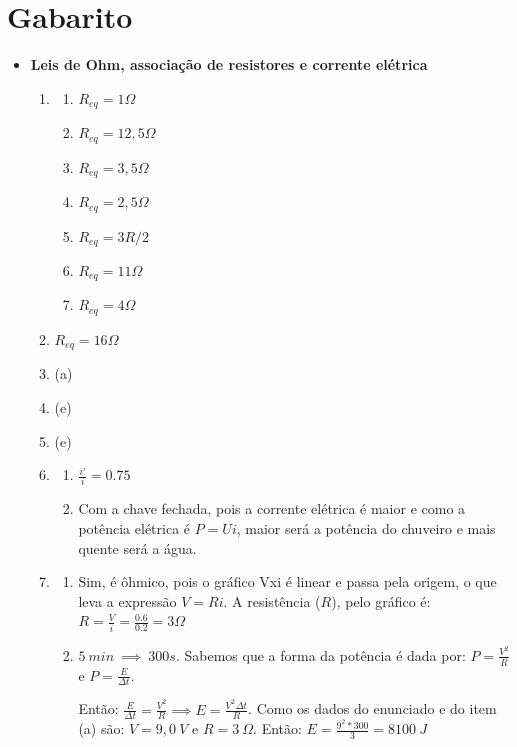\documentclass[12pt,letterpaper,fleqn]{article}
\begin{document}
    \section*{Gabarito}
    \begin{itemize}
        \item \textbf{Leis de Ohm, associação de resistores e corrente elétrica}
        
        \begin{enumerate}
            \item 
            \begin{enumerate}
                \item $R_{eq}= 1 \Omega$
                \item $R_{eq}= 12,5 \Omega$
                \item $R_{eq}= 3,5 \Omega$
                \item $R_{eq}= 2,5 \Omega$
                \item $R_{eq}= 3R/2 $
                \item $R_{eq}= 11 \Omega$
                \item $R_{eq}= 4 \Omega$
            \end{enumerate}
            \item $R_{eq}= 16 \Omega$
            \item (a)
            \item (e)
            \item (e)
            \item \begin{enumerate}
                \item $\frac{i'}{i}=0.75$
                \item Com a chave fechada, pois a corrente elétrica é maior e como a potência elétrica é $P=Ui$, maior será a potência do chuveiro e mais quente será a água.
            \end{enumerate}
            \item \begin{enumerate}
                \item Sim, é ôhmico, pois o gráfico Vxi é linear e passa pela origem, o que leva a expressão $V=Ri$. A resistência ($R$), pelo gráfico é: $R=\frac{V}{i}=\frac{0.6}{0.2}= 3\Omega$
                \item $5\: min\: \implies\: 300s$. Sabemos que a forma da potência é dada por: $P=\frac{V^2}{R}$ e $P=\frac{E}{\Delta t}$. 
                
                Então: $\frac{E}{\Delta t}= \frac{V^2}{R} \implies E =\frac{V^{2}\Delta t}{R}$.  Como os dados do enunciado e do item (a) são: $V=9,0\:V$ e $R=3\: \Omega$. Então: $E=\frac{9^2*300}{3}= 8100 \:J$
                

\end{enumerate}
\end{enumerate}
\end{itemize}
\end{document}
